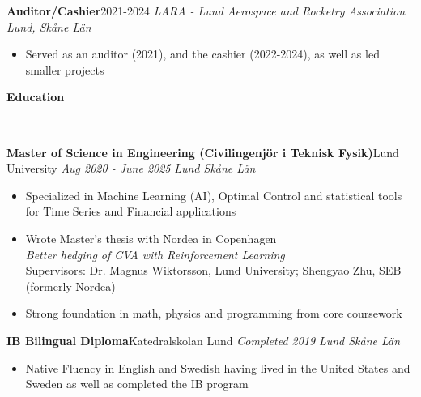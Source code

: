 \documentclass[10pt, a4paper, english]{article}
\newcommand{\mysection}[1]{\color{black}\textbf{\LARGE{#1}}\\
				        \rule[1em]{\widthof{\textbf{\LARGE{#1}}}}{1.333pt} \color{darkgray!80!black}\\ \vspace{-1em}}
\newcommand{\WExperience}[4]{\normalsize \noindent \textbf{#1}\hfill #3 \newline \textit{\footnotesize #2} \hfill \textit{\footnotesize #4} \vspace{-0.35em}}
\begin{document}
\begin{paracol}{2}
\vspace{0.3em}
\WExperience{Auditor/Cashier}{LARA - Lund Aerospace and Rocketry Association}{2021-2024}{Lund, Skåne Län}
\begin{itemize}[leftmargin =\widthof{$\bullet$~~~~~}]
\item Served as an auditor (2021), and the cashier (2022-2024), as well as led smaller projects
\end{itemize}

\vspace{.75em}
\mysection{Education}
\WExperience{Master of Science in Engineering (Civilingenjör i Teknisk Fysik)}{Aug 2020 - June 2025}{Lund University}{Lund Skåne Län}
\begin{itemize}[leftmargin =\widthof{$\bullet$~~~~~}]
\item Specialized in Machine Learning (AI), Optimal Control and statistical tools for Time Series and Financial applications
\item Wrote Master's thesis with Nordea in Copenhagen \\ \textit{Better hedging of CVA with Reinforcement Learning} \\ Supervisors: Dr. Magnus Wiktorsson, Lund University; Shengyao Zhu, SEB (formerly Nordea)
\item Strong foundation in math, physics and programming from core coursework
\end{itemize}

\WExperience{IB Bilingual Diploma}{Completed 2019}{Katedralskolan Lund}{Lund Skåne Län}
\begin{itemize}[leftmargin =\widthof{$\bullet$~~~~~}]
\item Native Fluency in English and Swedish having lived in the United States and Sweden as well as completed the IB program
\end{itemize}

\end{paracol}
\end{document}
